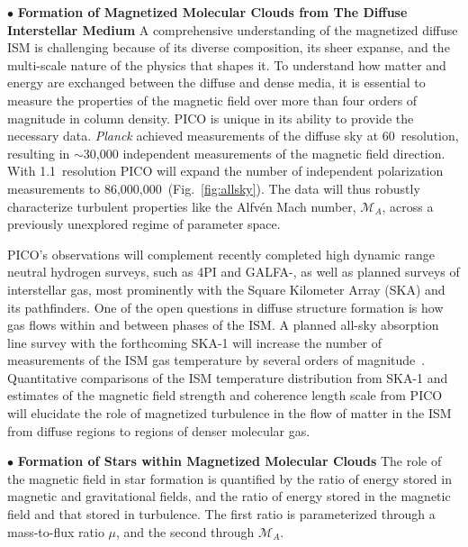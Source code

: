 \documentclass[PICOReport.tex]{subfiles}
\begin{document}
\noindent$\bullet$ {\bf Formation of Magnetized Molecular Clouds from The Diffuse Interstellar Medium} \hspace{0.1in}
A comprehensive understanding of the magnetized diffuse \ac{ISM} is challenging because of its diverse composition, its sheer expanse, and the multi-scale nature of the physics that shapes it. To understand how matter and energy are exchanged between the diffuse and dense media, it is essential to measure the properties of the magnetic field over more than four orders of magnitude in column density. PICO is unique in its ability to provide the necessary data. \textit{Planck} achieved measurements of the diffuse sky at 60\arcmin\ resolution, resulting in $\sim$30,000 independent measurements of the magnetic field direction.  With 1.1\arcmin~resolution PICO will expand the number of independent polarization measurements to 86,000,000~(Fig.~\ref{fig:allsky}). The data will thus robustly characterize turbulent properties like the Alfv\'{e}n Mach number, $\mathcal{M}_A$, across a previously unexplored regime of parameter space. 

PICO's observations will complement recently completed high dynamic range neutral hydrogen surveys, such as \HI4PI \citep{HI4PI:2016} and GALFA-\hi \citep{Peek:2018}, as well as planned surveys of interstellar gas, most prominently with the Square Kilometer Array (SKA) and its pathfinders. One of the open questions in diffuse structure formation is how gas flows within and between phases of the \ac{ISM}. A planned all-sky absorption line survey with the forthcoming SKA-1 will increase the number of measurements of the \ac{ISM} gas temperature by several orders of magnitude~\citep{McClure-Griffiths2015}. Quantitative comparisons of the \ac{ISM} temperature distribution from SKA-1 and estimates of the magnetic field strength and coherence length scale from PICO will elucidate the role of magnetized turbulence in the flow of matter in the \ac{ISM} from diffuse regions to regions of denser molecular gas.

\noindent$\bullet$ {\bf Formation of Stars within Magnetized Molecular Clouds} \hspace{0.1in}
The role of the magnetic field in star formation is quantified by the ratio of energy stored in magnetic and gravitational fields, and the ratio of energy stored in the magnetic field and that stored in turbulence. The first ratio is parameterized through a mass-to-flux ratio $\mu$, and the second
through $\mathcal{M}_A$. 
\end{document}
